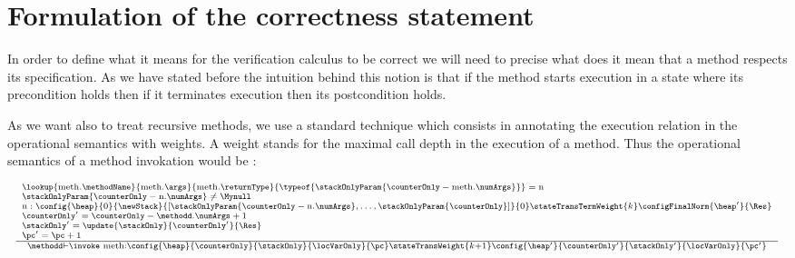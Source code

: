 \newtheorem{defCorrect}{Definition}[section]
\newtheorem{vcGenCorrect}{Theorem}[section]

\section{Formulation of the correctness statement}\label{proof:defineCorrect}

In order to define what it means for the verification calculus to be correct we will need to 
 precise what does it mean that a  method respects its specification. As we have stated 
 before the intuition behind this notion is that if the method starts execution in a state 
 where its precondition  holds then if it terminates execution then its postcondition holds.
  
 As we want also to treat recursive methods, we use a standard technique which consists in  annotating the execution 
relation in  the operational semantics with weights. A weight  stands for  the maximal 
call depth in the execution of a  method. 
  Thus the operational semantics of a method invokation would be :
 
$$ \begin{array}{l}
              {\scriptsize \frac{\begin{array}{l} 
                        \lookup{\mbox{\rm meth}.\methodName}{ \mbox{\rm meth}.\args  }{\mbox{\rm meth}.\returnType }{\typeof{ \stackOnlyParam{ \counterOnly - \mbox{\rm meth}.\numArgs }} } = \mbox{\rm n} \\
	                        \stackOnlyParam{ \counterOnly - \mbox{\rm n}.\numArgs } \neq \Mynull   \\
	                      \mbox{\rm n}  :         \config{\heap}       
                                                       {0}
						       {\newStack }
                                                       {\lbrack \stackOnlyParam{ \counterOnly - \mbox{\rm n}.\numArgs },\ldots ,\stackOnlyParam{ \counterOnly} \rbrack }
						       {0} 
						       \stateTransTermWeight{k}
						       \configFinalNorm{\heap'}{\Res}\\
				                       \counterOnly' = \counterOnly - \methodd.\numArgs + 1 \\
						       \stackOnly' = \update{\stackOnly}{\counterOnly'}{\Res} \\
						       \pc' = \pc + 1
			         \end{array}  }	         
	         {\methodd \vdash \invoke \  \mbox{\rm meth} :  \config{\heap}{\counterOnly}{\stackOnly}{\locVarOnly}{\pc} 
		                        \stateTransWeight{k + 1}
					\config{\heap' }{\counterOnly'}{\stackOnly' }{\locVarOnly}{\pc'}} }
\end{array}$$

